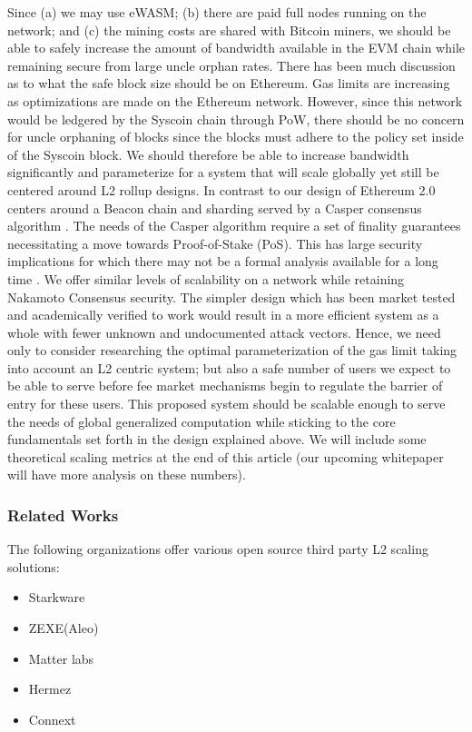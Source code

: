 \documentclass[peerreview]{ieeesyscoin}
\begin{document}
Since (a) we may use eWASM; (b) there are paid full nodes running on the network; and (c) the mining costs are shared with Bitcoin miners, we should be able to safely increase the amount of bandwidth available in the EVM chain while remaining secure from large uncle orphan rates. There has been much discussion as to what the safe block size should be on Ethereum. Gas limits are increasing as optimizations are made on the Ethereum network. However, since this network would be ledgered by the Syscoin chain through PoW, there should be no concern for uncle orphaning of blocks since the blocks must adhere to the policy set inside of the Syscoin block. We should therefore be able to increase bandwidth significantly and parameterize for a system that will scale globally yet still be centered around L2 rollup designs. In contrast to our design of Ethereum 2.0 centers around a Beacon chain and sharding served by a Casper consensus algorithm \cite{But17}. The needs of the Casper algorithm require a set of finality guarantees necessitating a move towards Proof-of-Stake (PoS). This has large security implications for which there may not be a formal analysis available for a long time \cite{Neu21}.  We offer similar levels of scalability on a network while retaining Nakamoto Consensus security. The simpler design which has been market tested and academically verified to work would result in a more efficient system as a whole with fewer unknown and undocumented attack vectors. Hence, we need only to consider researching the optimal parameterization of the gas limit taking into account an L2 centric system; but also a safe number of users we expect to be able to serve before fee market mechanisms begin to regulate the barrier of entry for these users. This proposed system should be scalable enough to serve the needs of global generalized computation while sticking to the core fundamentals set forth in the design explained above.  We will include some theoretical scaling metrics at the end of this article (our upcoming whitepaper will have more analysis on these numbers).

\subsubsection{Related Works}

The following organizations offer various open source third party L2 scaling solutions:

\begin{itemize}
\item Starkware \cite{Sta20b}
\item ZEXE(Aleo) \cite{aleo21}
\item Matter labs \cite{matter21}
\item Hermez \cite{hermez21}
\item Connext \cite{connext21}
\end{itemize}
\end{document}
